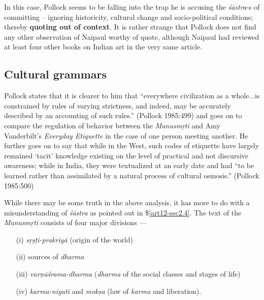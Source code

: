 In this case, Pollock seems to be falling into the trap he is accusing the {\sl śāstra}-s of committing -- ignoring historicity, cultural change and socio-political conditions; thereby {\bf quoting out of context}. It is rather strange that Pollock does not ﬁnd any other observation of Naipaul worthy of quote, although Naipaul had reviewed at least four other books on Indian art in the very same article.

\subsection{Cultural grammars}\label{art12-sec3.3}

Pollock states that it is clearer to him that ``everywhere civilization as a whole...is constrained by rules of varying strictness, and indeed, may be accurately described by an accounting of such rules.'' (Pollock 1985:499) and goes on to compare the regulation of behavior between the {\sl Manusmṛti} and Amy Vanderbilt's {\sl Everyday Etiquette} in the case of one person meeting another. He further goes on to say that while in the West, such codes of etiquette have largely remained `tacit' knowledge existing on the level of practical and not discursive awareness; while in India, they were textualized at an early date and had ``to be learned rather than assimilated by a natural process of cultural osmosis.'' (Pollock 1985:500) 

While there may be some truth in the above analysis, it has more to do with a misunderstanding of {\sl śāstra} as pointed out in \$\ref{art12-sec2.4}. The text of the {\sl Manusmṛti} consists of four major divisions ---
\begin{itemize}
\item[(i)] {\sl sṛṣṭi-prakriyā} (origin of the world)

\item[(ii)] sources of {\sl dharma}

\item[(iii)] {\sl varṇāśrama-dharma} ({\sl dharma} of the social classes and stages of life)

\item[(iv)] {\sl karma-niyati} and {\sl mokṣa} (law of {\sl karma} and liberation).
\end{itemize}

